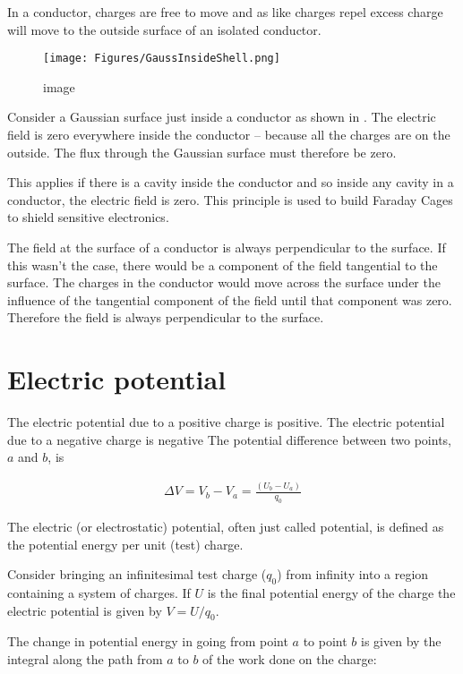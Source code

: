 \documentclass[
]{book}
\theoremstyle{definition}
\theoremstyle{definition}
\theoremstyle{definition}
\theoremstyle{definition}
\theoremstyle{remark}
\begin{document}
In a conductor, charges are free to move and as like charges repel
excess charge will move to the outside surface of an isolated conductor.

\begin{figure}
\centering
\texttt{[image: Figures/GaussInsideShell.png]}
\caption{image}
\end{figure}

Consider a Gaussian surface just inside a conductor as shown in . The
electric field is zero everywhere inside the conductor -- because all
the charges are on the outside. The flux through the Gaussian surface
must therefore be zero.

This applies if there is a cavity inside the conductor and so inside any
cavity in a conductor, the electric field is zero. This principle is
used to build Faraday Cages to shield sensitive electronics.

The field at the surface of a conductor is always perpendicular to the
surface. If this wasn't the case, there would be a component of the
field tangential to the surface. The charges in the conductor would move
across the surface under the influence of the tangential component of
the field until that component was zero. Therefore the field is always
perpendicular to the surface.

\hypertarget{electric-potential}{%
\section{Electric potential}\label{electric-potential}}

The electric potential due to a positive charge is positive. The
electric potential due to a negative charge is negative The potential
difference between two points, \(a\) and \(b\), is

\[\begin{aligned}
\Delta V = V_b - V_a =\frac{(U_b - U_a)}{q_0}   
\end{aligned}\]

The electric (or electrostatic) potential, often just called potential,
is defined as the potential energy per unit (test) charge.

Consider bringing an infinitesimal test charge (\(q_0\)) from infinity
into a region containing a system of charges. If \(U\) is the final
potential energy of the charge the electric potential is given by
\(V = U/q_0\).

The change in potential energy in going from point \(a\) to point \(b\) is
given by the integral along the path from \(a\) to \(b\) of the work done on
the charge:
\end{document}
